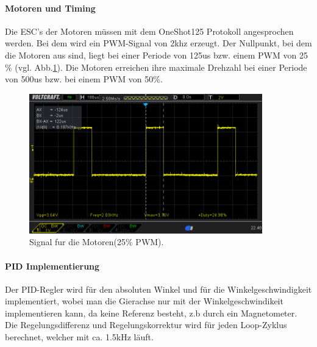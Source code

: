 \documentclass[12pt,a4paper, ngerman]{article}
\begin{document}
\paragraph{Motoren und Timing}
Die ESC's der Motoren müssen mit dem OneShot125 Protokoll\cite{website:OL_OneShot125} angesprochen werden. Bei dem wird ein PWM-Signal von 2khz erzeugt. Der Nullpunkt, bei dem die Motoren aus sind, liegt bei einer Periode von 125us bzw. einem PWM von 25$\%$ (vgl. Abb.\ref{pwm}). Die Motoren erreichen ihre maximale Drehzahl bei einer Periode von 500us bzw. bei einem PWM von 50$\%$.
\begin{figure}[h]
\centering
\includegraphics[width=0.9\textwidth]{PWM_25.png}
\caption[]{Signal fur die Motoren(25$\%$ PWM).}\label{pwm}
\end{figure}
\paragraph{PID Implementierung}
Der PID-Regler wird für den absoluten Winkel und für die Winkelgeschwindigkeit implementiert, wobei man die Gierachse nur mit der Winkelgeschwindikeit implementieren kann, da keine Referenz besteht, z.b durch ein Magnetometer. Die Regelungsdifferenz und Regelungskorrektur wird für jeden Loop-Zyklus berechnet, welcher mit ca. 1.5kHz läuft.
\newpage
\end{document}
